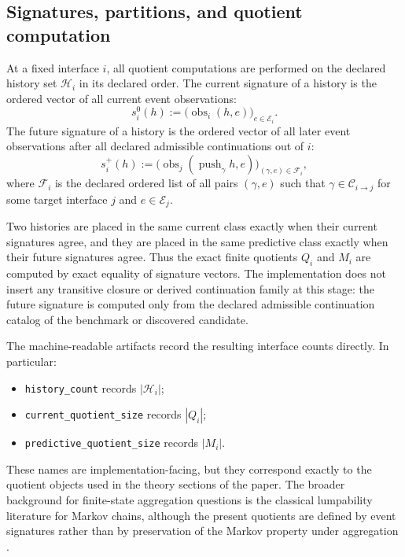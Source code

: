 \documentclass[11pt]{article}
\newcommand{\CurrentQ}{Q}
\newcommand{\PredictiveQ}{M}
\newcommand{\Histories}{\mathcal{H}}
\theoremstyle{definition}
\begin{document}
\subsection{Signatures, partitions, and quotient computation}\label{subsec:eff-signatures}
At a fixed interface $i$, all quotient computations are performed on the declared history set $\Histories_i$ in its declared order. The current signature of a history is the ordered vector of all current event observations:
\begin{equation}
s_i^{0}(h)
:=
\bigl(\operatorname{obs}_i(h,e)\bigr)_{e\in\mathcal{E}_i}.
\label{eq:current-signature}
\end{equation}
The future signature of a history is the ordered vector of all later event observations after all declared admissible continuations out of $i$:
\begin{equation}
s_i^{+}(h)
:=
\bigl(
\operatorname{obs}_j(\operatorname{push}_{\gamma} h,e)
\bigr)_{(\gamma,e)\in\mathcal{F}_i},
\label{eq:future-signature}
\end{equation}
where $\mathcal{F}_i$ is the declared ordered list of all pairs $(\gamma,e)$ such that $\gamma\in\mathcal{C}_{i\to j}$ for some target interface $j$ and $e\in\mathcal{E}_j$.

Two histories are placed in the same current class exactly when their current signatures agree, and they are placed in the same predictive class exactly when their future signatures agree. Thus the exact finite quotients $\CurrentQ_i$ and $\PredictiveQ_i$ are computed by exact equality of signature vectors. The implementation does not insert any transitive closure or derived continuation family at this stage: the future signature is computed only from the declared admissible continuation catalog of the benchmark or discovered candidate.

The machine-readable artifacts record the resulting interface counts directly. In particular:
\begin{itemize}
\item \texttt{history\_count} records $|\Histories_i|$;
\item \texttt{current\_quotient\_size} records $|\CurrentQ_i|$;
\item \texttt{predictive\_quotient\_size} records $|\PredictiveQ_i|$.
\end{itemize}
These names are implementation-facing, but they correspond exactly to the quotient objects used in the theory sections of the paper.
The broader background for finite-state aggregation questions is the classical lumpability literature for Markov chains, although the present quotients are defined by event signatures rather than by preservation of the Markov property under aggregation \citep{KemenySnell1976FiniteMarkovChains,Buchholz1994ExactOrdinaryLumpability}.
\end{document}

